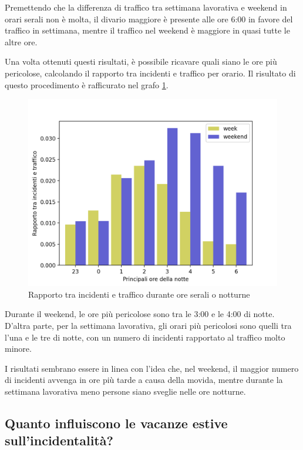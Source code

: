 \documentclass[a4paper,12pt]{report}
\begin{document}
Premettendo che la differenza di traffico tra settimana lavorativa e 
weekend in orari serali non è molta, il divario maggiore è presente alle ore 6:00 
in favore del traffico in settimana, mentre il traffico nel weekend è maggiore in 
quasi tutte le altre ore.

Una volta ottenuti questi risultati, è possibile ricavare quali siano le ore 
più pericolose, calcolando il rapporto tra incidenti e traffico per orario.
Il risultato di questo procedimento è rafficurato nel grafo \ref{fig:rapp-inc-traff}.

\begin{figure}
    \includegraphics[width=\linewidth]{../src/area_c/rapporto_inc_notte.png}
    \caption{Rapporto tra incidenti e traffico durante ore serali o notturne}
    \label{fig:rapp-inc-traff}
\end{figure}

Durante il weekend, le ore più pericolose sono tra le 3:00 e le 4:00 di notte. 
D'altra parte, per la settimana lavorativa, gli orari più pericolosi sono quelli 
tra l'una e le tre di notte, con un numero di incidenti rapportato al 
traffico molto minore. 

I risultati sembrano essere in linea con l'idea che, nel weekend, il maggior 
numero di incidenti avvenga in ore più tarde a causa della movida, mentre durante 
la settimana lavorativa meno persone siano sveglie nelle ore notturne.

\subsection{Quanto influiscono le vacanze estive sull'incidentalità?}
\end{document}
